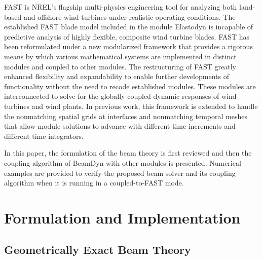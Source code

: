 \documentclass{aiaa-tc}
\begin{document}
FAST is NREL's flagship multi-physics engineering tool for analyzing both land-based and offshore wind turbines under realistic operating conditions.  
The established FAST blade model included in the module Elastodyn is incapable 
of predictive analysis of highly flexible, composite wind turbine blades. 
FAST has been reformulated under a new modularized framework that provides a rigorous means by which various mathematical systems are implemented in distinct modules and coupled to other modules. 
The restructuring of FAST greatly enhanced flexibility and expandability to enable further developments of functionality without the need to recode established modules. 
These modules are interconnected to solve for the globally coupled dynamic responses of wind turbines and wind plants. \cite{Jonkman:2013,website:FASTModularizationFramework} In previous work, this framework is extended to handle the nonmatching spatial grids at interfaces and nonmatching temporal meshes that allow module solutions to advance with different time increments and different time integrators.\cite{Sprague:2014}

In this paper, the formulation of the beam theory is first reviewed and then the coupling algorithm of BeamDyn with other modules is presented. 
Numerical examples are provided to verify the proposed beam solver and its coupling algorithm when it is running in a coupled-to-FAST mode.

\section{Formulation and Implementation}

\subsection{Geometrically Exact Beam Theory}
\end{document}
